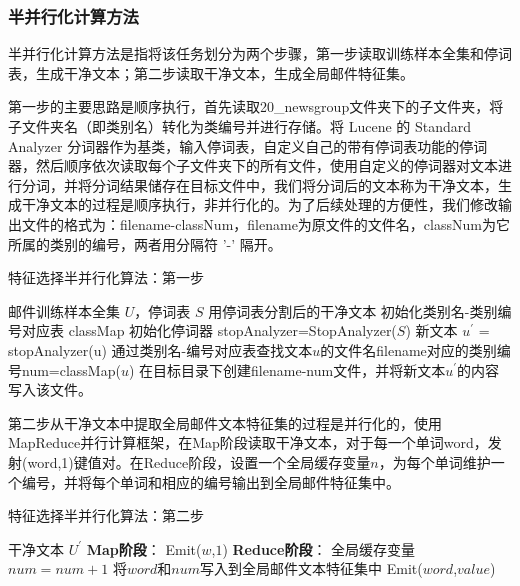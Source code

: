 \documentclass[lang=cn,11pt]{elegantpaper}
\begin{document}
\subsubsection{半并行化计算方法}
半并行化计算方法是指将该任务划分为两个步骤，第一步读取训练样本全集和停词表，生成干净文本；第二步读取干净文本，生成全局邮件特征集。\par
第一步的主要思路是顺序执行，首先读取20\_newsgroup文件夹下的子文件夹，将子文件夹名（即类别名）转化为类编号并进行存储。将 Lucene 的 Standard Analyzer 分词器作为基类，输入停词表，自定义自己的带有停词表功能的停词器，然后顺序依次读取每个子文件夹下的所有文件，使用自定义的停词器对文本进行分词，并将分词结果储存在目标文件中，我们将分词后的文本称为干净文本，生成干净文本的过程是顺序执行，非并行化的。为了后续处理的方便性，我们修改输出文件的格式为：filename-classNum，filename为原文件的文件名，classNum为它所属的类别的编号，两者用分隔符 '-' 隔开。\par
\begin{algorithm}[H]
  \caption{特征选择半并行化算法：第一步}
  \label{alg:Framwork}
  \begin{algorithmic}[1]
    \Require
    邮件训练样本全集 $U$，停词表 $S$
    \Ensure
    用停词表分割后的干净文本
    \State 初始化类别名-类别编号对应表 classMap
    \State 初始化停词器 stopAnalyzer=StopAnalyzer($S$)
      \State 新文本 $u^\prime$ = stopAnalyzer(u)
      \State 通过类别名-编号对应表查找文本$u$的文件名filename对应的类别编号num=classMap($u$)
      \State 在目标目录下创建filename-num文件，并将新文本$u^\prime$的内容写入该文件。
   \EndFor
  \end{algorithmic}
\end{algorithm}
第二步从干净文本中提取全局邮件文本特征集的过程是并行化的，使用MapReduce并行计算框架，在Map阶段读取干净文本，对于每一个单词word，发射(word,1)键值对。在Reduce阶段，设置一个全局缓存变量$n$，为每个单词维护一个编号，并将每个单词和相应的编号输出到全局邮件特征集中。\par
\begin{algorithm}[H]
  \caption{特征选择半并行化算法：第二步}
  \label{alg:Framwork}
  \begin{algorithmic}[1]
    \Require
    干净文本 $U^\prime$
    \Ensure
    \State \textbf{Map阶段}：
        \State Emit($w$,$1$)
      \EndFor
    \EndFunction
    \State \textbf{Reduce阶段}：
      \State 全局缓存变量$num=num+1$
      \State 将$word$和$num$写入到全局邮件文本特征集中
      \State Emit($word$,$value$)
    \EndFunction
  \end{algorithmic}
\end{algorithm}
\end{document}
